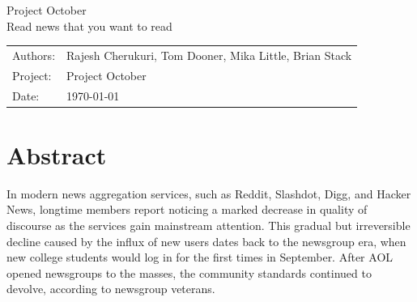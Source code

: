 \documentclass[11pt,letterpaper]{article}
\begin{document}

\newpage
\pagestyle{fancy}
\fancyhf{}
\vspace*{6cm}
\begin{center}
\Huge  {Project October}\\
\vspace{1cm}
\huge {Read news that you want to read}\\
\vspace{1cm}
\end{center}
\vfill
\begin{flushright}
\begin{tabular}{ll}
Authors: & Rajesh Cherukuri, Tom Dooner, Mika Little, Brian Stack\\
Project: & Project October\\
Date: & \today
\end{tabular}
\end{flushright}

\newpage
\pagestyle{fancy}
\fancyhf{}

\fancyhead[L]{\small \rm \textit{\rightmark}}
\fancyhead[R]{\small \rm \textbf{\thepage}}



\renewcommand{\sectionmark}[1]{\markright{\thesection.\ #1}}
\renewcommand{\headrulewidth}{0.5pt}
\renewcommand{\footrulewidth}{0.5pt}


\tableofcontents
\listoffigures

\newpage
\section{Abstract}

In modern news aggregation services, such as Reddit, Slashdot, Digg, and Hacker News, longtime members report noticing a marked decrease in quality of discourse as the services gain mainstream attention.
This gradual but irreversible decline caused by the influx of new users dates back to the newsgroup era, when new college students would log in for the first times in September.
After AOL opened newsgroups to the masses, the community standards continued to devolve, according to newsgroup veterans\cite{september}.
\end{document}
